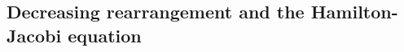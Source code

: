 \documentclass[11pt]{article}
\newtheorem{prop}[thm]{Proposition}
\newtheorem{lemma}[thm]{Lemma}
\newtheorem{cor}[thm]{Corollary}
\numberwithin{equation}{section} %
\DeclareMathOperator{\supp}{supp}
\newcommand{\R}{{\mathbb{R}}}
\newcommand{\T}{{\mathbb{T}}}
\begin{document}

\subsection{Decreasing rearrangement and the Hamilton-Jacobi equation}\label{subsec:decreasing_rearrangement}
\end{document}
